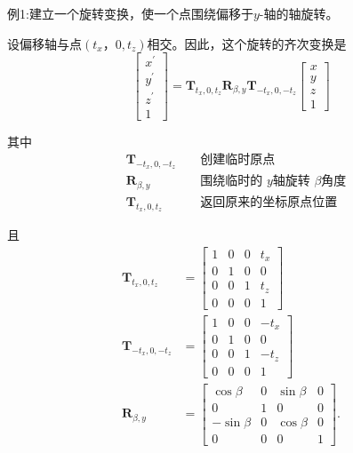 例1:建立一个旋转变换，使一个点围绕偏移于$y$-轴的轴旋转。

设偏移轴与点$\left(t_{x}， 0, t_{z}\right)$相交。因此，这个旋转的齐次变换是
$$
\left[\begin{array}{c}
x^{\prime} \\
y^{\prime} \\
z^{\prime} \\
1
\end{array}\right]=\mathbf{T}_{t_{x}, 0, t_{z}} \mathbf{R}_{\beta, y} \mathbf{T}_{-t_{x}, 0,-t_{z}}\left[\begin{array}{c}
x \\
y \\
z \\
1
\end{array}\right]
$$

其中
$$
\begin{aligned}
& \mathbf{T}_{-t_{x}, 0,-t_{z}} && \text { 创建临时原点 } \\
& \mathbf{R}_{\beta, y} && \text { 围绕临时的 } y \text {轴旋转 }\beta \text{角度} \\
& \mathbf{T}_{t_{x}, 0, t_{z}} && \text { 返回原来的坐标原点位置 }
\end{aligned}
$$

且
$$
\begin{aligned}
\mathbf{T}_{t_{x}, 0, t_{z}} & =\left[\begin{array}{llll}
1 & 0 & 0 & t_{x} \\
0 & 1 & 0 & 0 \\
0 & 0 & 1 & t_{z} \\
0 & 0 & 0 & 1
\end{array}\right] \\
\mathbf{T}_{-t_{x}, 0,-t_{z}} & =\left[\begin{array}{cccc}
1 & 0 & 0 & -t_{x} \\
0 & 1 & 0 & 0 \\
0 & 0 & 1 & -t_{z} \\
0 & 0 & 0 & 1
\end{array}\right] \\
\mathbf{R}_{\beta, y} & =\left[\begin{array}{cccc}
\cos \beta & 0 & \sin \beta & 0 \\
0 & 1 & 0 & 0 \\
-\sin \beta & 0 & \cos \beta & 0 \\
0 & 0 & 0 & 1
\end{array}\right] .
\end{aligned}
$$

